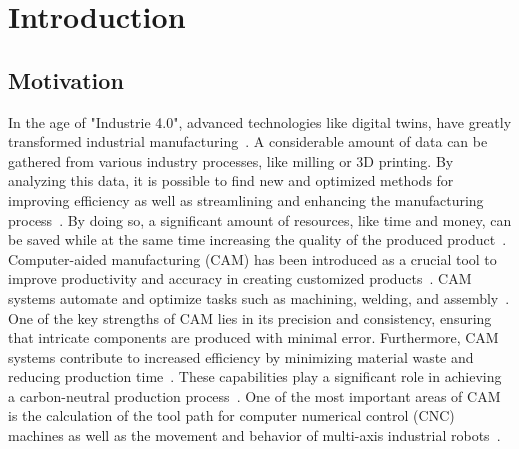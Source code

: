 \chapter{Introduction}%
\section{Motivation}%

In the age of "Industrie 4.0", advanced technologies like digital twins, have greatly transformed industrial manufacturing~\cite{Singh.2021}. A considerable amount of data can be gathered from various industry processes, like milling or 3D printing. By analyzing this data, it is possible to find new and optimized methods for improving efficiency as well as streamlining and enhancing the manufacturing process~\cite{Ghobakhloo.2020}. By doing so, a significant amount of resources, like time and money, can be saved while at the same time increasing the quality of the produced product~\cite{Bibby.2018,Simonis.2016}.
Computer-aided manufacturing (\acrshort{CAM}) has been introduced as a crucial tool to improve productivity and accuracy in creating customized products~\cite{Feldhausen.2022}. \acrshort{CAM} systems automate and optimize tasks such as machining, welding, and assembly~\cite{LalitNarayan.2013b}. One of the key strengths of \acrshort{CAM} lies in its precision and consistency, ensuring that intricate components are produced with minimal error. Furthermore, \acrshort{CAM} systems contribute to increased efficiency by minimizing material waste and reducing production time~\cite{Dubovska.2014}. These capabilities play a significant role in achieving a carbon-neutral production process~\cite{Saxena.2020}. One of the most important areas of \acrshort{CAM} is the calculation of the tool path for computer numerical control (\acrshort{CNC}) machines as well as the movement and behavior of multi-axis industrial robots~\cite{Pan}. 


